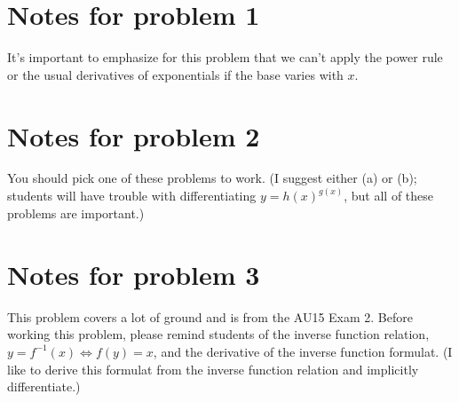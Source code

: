 \documentclass[nooutcomes]{ximera}
\begin{document}







\section{Notes for problem 1}
It's important to emphasize for this problem that we can't apply the power rule or the usual derivatives of exponentials if the base varies with $x$.

\section{Notes for problem 2}
You should pick one of these problems to work.
(I suggest either (a) or (b); students will have trouble with differentiating $y = h(x)^{g(x)}$, but all of these problems are important.)

\section{Notes for problem 3}
This problem covers a lot of ground and is from the AU15 Exam 2.
Before working this problem, please remind students of the inverse function relation, $y = f^{-1}(x) \iff f(y) = x$, and the derivative of the inverse function formulat.
(I like to derive this formulat from the inverse function relation and implicitly differentiate.)
\end{document}

